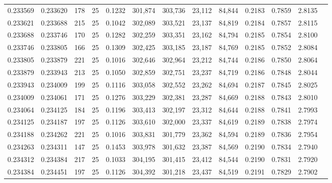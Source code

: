\begin{tabular}{rrrrrrrrrrrrr}
0.233569 & 0.233620 &   178 &  25 &                                     0.1232 & 301,874 & 303,736 &  23,112 &  84,844 & 0.2183 & 0.7859 & 2.8135 \\
0.233621 & 0.233688 &   215 &  25 &                                     0.1042 & 302,089 & 303,521 &  23,137 &  84,819 & 0.2184 & 0.7857 & 2.8115 \\
0.233688 & 0.233746 &   170 &  25 &                                     0.1282 & 302,259 & 303,351 &  23,162 &  84,794 & 0.2185 & 0.7854 & 2.8100 \\
0.233746 & 0.233805 &   166 &  25 &                                     0.1309 & 302,425 & 303,185 &  23,187 &  84,769 & 0.2185 & 0.7852 & 2.8084 \\
0.233805 & 0.233879 &   221 &  25 &                                     0.1016 & 302,646 & 302,964 &  23,212 &  84,744 & 0.2186 & 0.7850 & 2.8064 \\
0.233879 & 0.233943 &   213 &  25 &                                     0.1050 & 302,859 & 302,751 &  23,237 &  84,719 & 0.2186 & 0.7848 & 2.8044 \\
0.233943 & 0.234009 &   199 &  25 &                                     0.1116 & 303,058 & 302,552 &  23,262 &  84,694 & 0.2187 & 0.7845 & 2.8025 \\
0.234009 & 0.234061 &   171 &  25 &                                     0.1276 & 303,229 & 302,381 &  23,287 &  84,669 & 0.2188 & 0.7843 & 2.8010 \\
0.234064 & 0.234125 &   184 &  25 &                                     0.1196 & 303,413 & 302,197 &  23,312 &  84,644 & 0.2188 & 0.7841 & 2.7993 \\
0.234125 & 0.234187 &   197 &  25 &                                     0.1126 & 303,610 & 302,000 &  23,337 &  84,619 & 0.2189 & 0.7838 & 2.7974 \\
0.234188 & 0.234262 &   221 &  25 &                                     0.1016 & 303,831 & 301,779 &  23,362 &  84,594 & 0.2189 & 0.7836 & 2.7954 \\
0.234263 & 0.234311 &   147 &  25 &                                     0.1453 & 303,978 & 301,632 &  23,387 &  84,569 & 0.2190 & 0.7834 & 2.7940 \\
0.234312 & 0.234384 &   217 &  25 &                                     0.1033 & 304,195 & 301,415 &  23,412 &  84,544 & 0.2190 & 0.7831 & 2.7920 \\
0.234384 & 0.234451 &   197 &  25 &                                     0.1126 & 304,392 & 301,218 &  23,437 &  84,519 & 0.2191 & 0.7829 & 2.7902 \\

\end{tabular}
